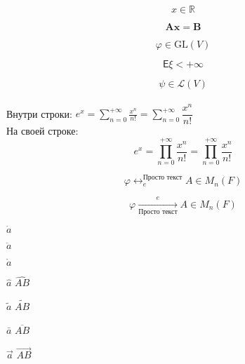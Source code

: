 \documentclass[a4paper, 12pt]{article}
\begin{document}
    \[x \in \mathbb R\] %

    \[\mathbf{Ax} = \mathbf B\] %

    \[\varphi \in \mathrm{GL}(V)\] %

    \[\mathsf E\xi < +\infty\] %

    \[\psi \in \mathcal L(V)\]\\ %



    Внутри строки: $e^x = \sum_{n = 0}^{+\infty}\frac{x^n}{n!} = \sum\limits_{n = 0}^{+\infty}\dfrac{x^n}{n!}$\\ %

    На своей строке:
    \[e^x = \prod_{n = 0}^{+\infty}\frac{x^n}{n!} = \prod\limits_{n = 0}^{+\infty}\dfrac{x^n}{n!}\]


    \[\varphi \leftrightarrow_e^{\text{Просто текст}} A \in M_n(F)\] %

    \[\varphi \xrightarrow[\text{Просто текст}]{e} A \in M_n(F)\] %


    $\dot a$

    $\ddot a$

    $\mathring a$

    $\hat a$ %
    \hfill
    $\widehat{AB}$ %

    $\tilde a$ %
    \hfill
    $\widetilde{AB}$ %

    $\bar a$ %
    \hfill
    $\overline{AB}$ %

    $\vec a$ %
    \hfill
    $\overrightarrow{AB}$ %
\end{document}
